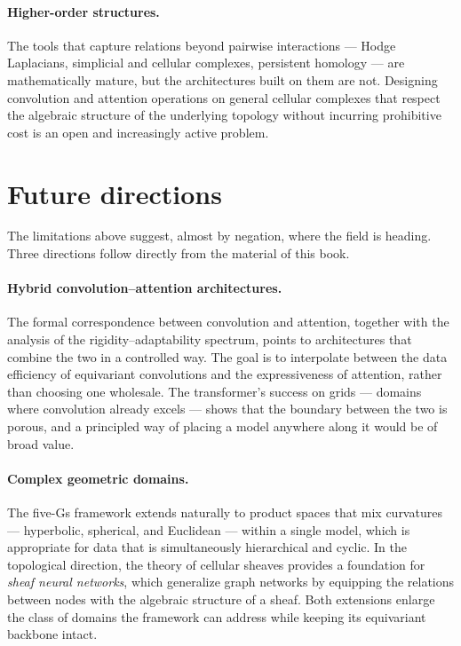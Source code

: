 \paragraph{Higher-order structures.}
The tools that capture relations beyond pairwise interactions --- Hodge
Laplacians, simplicial and cellular complexes, persistent homology --- are
mathematically mature, but the architectures built on them are not. Designing
convolution and attention operations on general cellular complexes that respect
the algebraic structure of the underlying topology without incurring prohibitive
cost is an open and increasingly active problem.

\section{Future directions}
\label{sec:concl:future}

The limitations above suggest, almost by negation, where the field is heading.
Three directions follow directly from the material of this book.

\paragraph{Hybrid convolution--attention architectures.}
The formal correspondence between convolution and attention, together with the
analysis of the rigidity--adaptability spectrum, points to architectures that
combine the two in a controlled way. The goal is to interpolate between the
data efficiency of equivariant convolutions and the expressiveness of attention,
rather than choosing one wholesale. The transformer's success on grids ---
domains where convolution already excels --- shows that the boundary between the
two is porous, and a principled way of placing a model anywhere along it would be
of broad value.

\paragraph{Complex geometric domains.}
The five-Gs framework extends naturally to product spaces that mix curvatures
--- hyperbolic, spherical, and Euclidean --- within a single model, which is
appropriate for data that is simultaneously hierarchical and cyclic. In the
topological direction, the theory of cellular sheaves provides a foundation for
\emph{sheaf neural networks}, which generalize graph networks by equipping the
relations between nodes with the algebraic structure of a sheaf. Both extensions
enlarge the class of domains the framework can address while keeping its
equivariant backbone intact.


